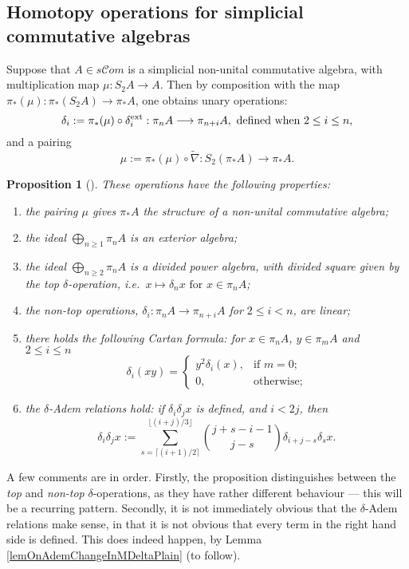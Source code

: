 \documentclass[11pt]{amsart} \renewcommand{\baselinestretch}{1.2}
\theoremstyle{plain}
\newtheorem{prop}[thm]{Proposition}
\theoremstyle{definition}
\renewcommand{\to}{\longrightarrow}
\newcommand{\scrC}{\mathscr{C}}
\newcommand{\algs}{{\scrC\!\textit{om}}}
\renewcommand{\mapsto}{\longmapsto}
\begin{document}
\begin{Constructing homotopy operations}
\subsection{Homotopy operations for simplicial commutative algebras}\label{Homotopy operations for simplicial commutative algebras}
Suppose that $A\in s \algs$ is a simplicial non-unital commutative algebra, with multiplication map $\mu:S_2A\to A$. Then by composition with the map $\pi_*(\mu):\pi_*(S_2A)\to \pi_*A$, one obtains unary operations:
\[\delta_i:=\pi_*(\mu)\circ\delta_i^\textup{ext}:\pi_nA\to \pi_{n+i}A,\textup{ defined when }2\leq i\leq n,\]
and a pairing\[\mu:=\pi_*(\mu)\circ\widetilde{\nabla}:S_2(\pi_*A)\to \pi_{*}A.\]
\begin{prop}[{\cite{DwyerHtpyOpsSimpComAlg.pdf}}]
\label{omnibus on htpy of simp algs}
These operations have the following properties:
\begin{enumerate}
\item the pairing $\mu$ gives $\pi_*A$ the structure of a non-unital commutative algebra;
\item the ideal $\bigoplus_{n\geq1}\pi_nA$ is an exterior algebra;
\item the ideal $\bigoplus_{n\geq2}\pi_nA$ is a divided power algebra, with divided square given by the \emph{top $\delta$-operation}, i.e.\ $x\mapsto \delta_nx\text{ for }x\in\pi_nA$;
\item the \emph{non-top operations}, $\delta_i:\pi_nA\to \pi_{n+i}A$ for $2\leq i<n$, are linear;
\item there holds the following \emph{Cartan formula}: for $x\in\pi_nA$, $y\in \pi_mA$ and $2\leq i\leq n$
\[\delta_i(xy)=\begin{cases}
y^2\delta_i(x),&\text{if }m=0;\\
0,&\text{otherwise};
\end{cases}
\]
\item \label{deltaademsunstable} the \emph{$\delta$-Adem relations} hold: if $\delta_i\delta_jx$ is defined, and $i<2j$, then
\[\delta_i\delta_jx:=\sum_{s=\lceil(i+1)/2\rceil}^{\lfloor(i+j)/3\rfloor}{j+s-i-1\choose j-s}\delta_{i+j-s}\delta_sx.\]
\end{enumerate}
\end{prop}
A few comments are in order. Firstly, the proposition distinguishes between the \emph{top} and \emph{non-top} $\delta$-operations, as they have rather different behaviour --- this will be a recurring pattern. Secondly, it is not immediately obvious that the $\delta$-Adem relations make sense, in that it is not obvious that every term in the right hand side is defined. This does indeed happen, by Lemma \ref{lemOnAdemChangeInMDeltaPlain} (to follow). 


\end{Constructing homotopy operations}
\end{document}
